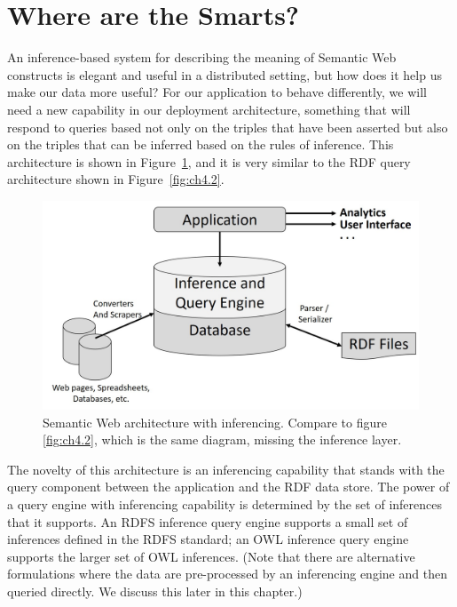 \section{Where are the Smarts?}

An inference-based system for describing the meaning of Semantic Web
constructs is elegant and useful in a distributed setting, but how does
it help us make our data more useful? For our application to behave
differently, we will need a new capability in our deployment
architecture, something that will respond to queries based not only on
the triples that have been asserted but also on the triples that can be
inferred based on the rules of inference. This architecture is shown in
Figure~\ref{fig:ch7.1}, and it is very similar to the RDF query architecture shown
in Figure~\ref{fig:ch4.2}.

\begin{figure}
\centering
\includegraphics[width=5in]{SWWOv3/media/ch7/figure-07-1.jpg}
\caption{Semantic Web architecture with inferencing.  Compare to figure \protect\ref{fig:ch4.2}, which is the same
diagram, missing the inference layer.}
\label{fig:ch7.1}
\end{figure}

The novelty of this architecture is an inferencing capability that
stands with the query component between the application and the RDF data
store. The power of a query engine with inferencing capability is
determined by the set of inferences that it supports. An RDFS inference
query engine supports a small set of inferences defined in the RDFS
standard; an OWL inference query engine supports the larger set of OWL
inferences. (Note that there are alternative formulations where the data
are pre-processed by an inferencing engine and then queried directly. We
discuss this later in this chapter.)

